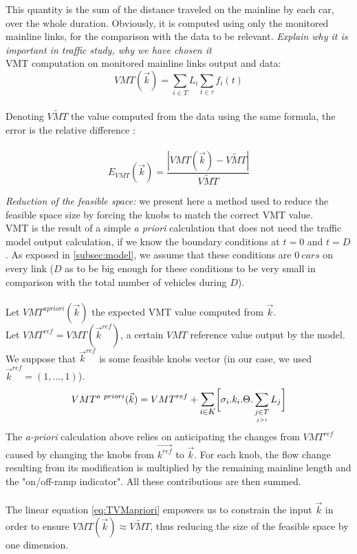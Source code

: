 This quantity is the sum of the distance traveled on the mainline by each car, over the whole duration.
Obviously, it is computed using only the monitored mainline links, for the comparison with the data to be relevant.
\emph{Explain why it is important in traffic study, why we have chosen it} 
\\
VMT computation on monitored mainline links output and data:
\begin{equation*}
	 VMT(\vec{k})=\sum_{i\in{T}}L_{i}\sum_{t\in \tau}f_{i}(t)
\end{equation*}
\\
Denoting $\widetilde{VMT}$ the value computed from the data using the same formula, the error is the relative difference :\\
\\
\begin{equation*}
	E_{VMT}(\vec{k})=\frac{|VMT(\vec{k})-\widetilde{VMT}|}{\widetilde{VMT}}
\end{equation*}

\emph{Reduction of the feasible space:} we present here a method used to reduce the feasible space size by forcing the knobs to match the correct VMT value.\\
VMT is the result of a simple \emph{a priori} calculation that does not need the traffic model output calculation, if we know the boundary conditions at $t=0$ and $t=D$. As exposed in \ref{subsec:model}, we assume that these conditions are $0\ cars$ on every link ($D$ as to be big enough for these conditions to be very small in comparison with the total number of vehicles during $D$).\\
\\
Let $VMT^{a priori}(\vec{k})$ the expected VMT value computed from $\vec{k}$.\\
Let $VMT^{ref}=VMT(\vec{k}^{ref})$, a certain $VMT$ reference value output by the model. We suppose that $\vec{k}^{ref}$ is some feasible knobs vector (in our case, we used $\vec{k}^{ref}=(1,...,1)$).\\
\begin{equation}
	\label{eq:TVMapriori}
	VMT^{a\ priori}(\vec{k})=VMT^{ref}+\mathlarger{\sum\limits_{i\in K}}\biggl[\sigma_{i}.k_{i}.\Theta.	\sum\limits_{\underset{j>i}{j\in T}}L_{j}\biggr]
\end{equation}	
The \emph{a-priori} calculation above relies on anticipating the changes from $VMT^{ref}$ caused by changing the knobs from $\vec{k^{ref}}$ to $\vec{k}$. For each knob, the flow change resulting from its modification is multiplied by the remaining mainline length and the "on/off-ramp indicator". All these contributions are then summed.\\
\\


The linear equation \ref{eq:TVMapriori} empowers us to constrain the input $\vec{k}$ in order to ensure $VMT(\vec{k})\approx \widetilde{VMT}$, thus reducing the size of the feasible space by one dimension.\\